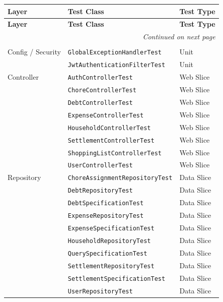 \begin{longtable}{@{}p{3.5cm}p{6.5cm}p{3cm}@{}}
\toprule
\textbf{Layer} & \textbf{Test Class} & \textbf{Test Type} \\ \midrule
\endfirsthead

\toprule
\textbf{Layer} & \textbf{Test Class} & \textbf{Test Type} \\ \midrule
\endhead

\midrule \multicolumn{3}{r}{\textit{Continued on next page}} \\
\endfoot

\bottomrule
\endlastfoot

\multicolumn{3}{@{}l}{\cellcolor{UCRow}\textbf{Backend Module}} \\[2pt]

Config / Security
    & \texttt{GlobalExceptionHandlerTest}
    & Unit \\
    & \texttt{JwtAuthenticationFilterTest}
    & Unit \\[4pt]

Controller
    & \texttt{AuthControllerTest}
    & Web Slice \\
    & \texttt{ChoreControllerTest}
    & Web Slice \\
    & \texttt{DebtControllerTest}
    & Web Slice \\
    & \texttt{ExpenseControllerTest}
    & Web Slice \\
    & \texttt{HouseholdControllerTest}
    & Web Slice \\
    & \texttt{SettlementControllerTest}
    & Web Slice \\
    & \texttt{ShoppingListControllerTest}
    & Web Slice \\
    & \texttt{UserControllerTest}
    & Web Slice \\[4pt]

Repository
    & \texttt{ChoreAssignmentRepositoryTest}
    & Data Slice \\
    & \texttt{DebtRepositoryTest}
    & Data Slice \\
    & \texttt{DebtSpecificationTest}
    & Data Slice \\
    & \texttt{ExpenseRepositoryTest}
    & Data Slice \\
    & \texttt{ExpenseSpecificationTest}
    & Data Slice \\
    & \texttt{HouseholdRepositoryTest}
    & Data Slice \\
    & \texttt{QuerySpecificationTest}
    & Data Slice \\
    & \texttt{SettlementRepositoryTest}
    & Data Slice \\
    & \texttt{SettlementSpecificationTest}
    & Data Slice \\
    & \texttt{UserRepositoryTest}
    & Data Slice \\[4pt]


\end{longtable}
